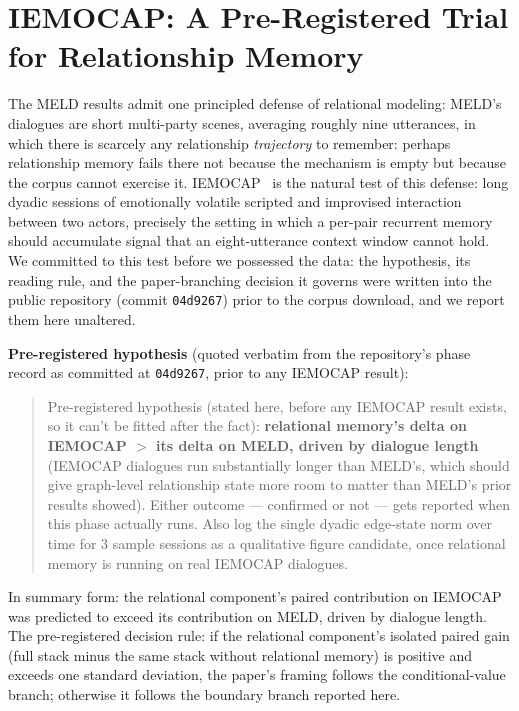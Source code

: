 \section{IEMOCAP: A Pre-Registered Trial for Relationship Memory}
\label{sec:iemocap}

The MELD results admit one principled defense of relational modeling: MELD's dialogues are short multi-party scenes, averaging roughly nine utterances, in which there is scarcely any relationship \textit{trajectory} to remember: perhaps relationship memory fails there not because the mechanism is empty but because the corpus cannot exercise it. IEMOCAP~\cite{busso2008iemocap} is the natural test of this defense: long dyadic sessions of emotionally volatile scripted and improvised interaction between two actors, precisely the setting in which a per-pair recurrent memory should accumulate signal that an eight-utterance context window cannot hold. We committed to this test before we possessed the data: the hypothesis, its reading rule, and the paper-branching decision it governs were written into the public repository (commit \texttt{04d9267}) prior to the corpus download, and we report them here unaltered.

\noindent\textbf{Pre-registered hypothesis} (quoted verbatim from the repository's phase record as committed at \texttt{04d9267}, prior to any IEMOCAP result):

\begin{quotation}
\noindent Pre-registered hypothesis (stated here, before any IEMOCAP result exists, so it can't be fitted after the fact): \textbf{relational memory's delta on IEMOCAP $>$ its delta on MELD, driven by dialogue length} (IEMOCAP dialogues run substantially longer than MELD's, which should give graph-level relationship state more room to matter than MELD's prior results showed). Either outcome --- confirmed or not --- gets reported when this phase actually runs. Also log the single dyadic edge-state norm over time for 3 sample sessions as a qualitative figure candidate, once relational memory is running on real IEMOCAP dialogues.
\end{quotation}

In summary form: the relational component's paired contribution on IEMOCAP was predicted to exceed its contribution on MELD, driven by dialogue length. The pre-registered decision rule: if the relational component's isolated paired gain (full stack minus the same stack without relational memory) is positive and exceeds one standard deviation, the paper's framing follows the conditional-value branch; otherwise it follows the boundary branch reported here.

